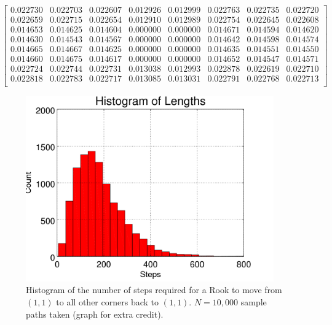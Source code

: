 \documentclass{amsart}
\numberwithin{equation}{section}
\begin{document}
\begin{equation}
    \label{eq:matrix_2}
     \begin{bmatrix}
   0.022730  & 0.022703 &  0.022607 &  0.012926 &  0.012999 &  0.022763 &  0.022735 &  0.022720 \\
   0.022659  & 0.022715 &  0.022654 &  0.012910 &  0.012989 &  0.022754 &  0.022645 &  0.022608\\
   0.014653  & 0.014625 &  0.014604 &  0.000000 &  0.000000 &  0.014671 &  0.014594 &  0.014620\\
   0.014630  & 0.014543 &  0.014567 &  0.000000 &  0.000000 &  0.014642 &  0.014598 &  0.014574\\
   0.014665  & 0.014667 &  0.014625 &  0.000000 &  0.000000 &  0.014635 &  0.014551 &  0.014550\\
   0.014660  & 0.014675 &  0.014617 &  0.000000 &  0.000000 &  0.014652 &  0.014547 &  0.014571\\
   0.022724  & 0.022744 &  0.022731 &  0.013038 &  0.012993 &  0.022878 &  0.022619 &  0.022710\\
   0.022818  & 0.022783 &  0.022717 &  0.013085 &  0.013031 &  0.022791 &  0.022768 &  0.022713\\
    \end{bmatrix}
\end{equation}

\begin{figure}
    \centering
    \includegraphics[width=0.95\textwidth]{figures/extraCredit/regular_N10000.png}
    \caption{Histogram of the number of steps required for a Rook to move from $(1,1)$ to all other corners back to $(1,1)$. $N=10,000$ sample paths taken (graph for extra credit).}
    \label{fig:extra_regular}
\end{figure}
\end{document}
